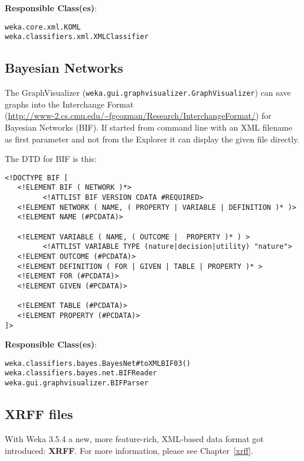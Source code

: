 \noindent \textbf{Responsible Class(es)}:

\begin{verbatim}
weka.core.xml.KOML
weka.classifiers.xml.XMLClassifier
\end{verbatim}

\subsection{Bayesian Networks}
The GraphVisualizer (\verb=weka.gui.graphvisualizer.GraphVisualizer=) can
save graphs into the Interchange Format\\
(\url{http://www-2.cs.cmu.edu/~fgcozman/Research/InterchangeFormat/}{}) for
Bayesian Networks (BIF). If started from command line with an XML
filename as first parameter and not from the Explorer it can display
the given file directly.

The DTD for BIF is this:

\begin{verbatim}
<!DOCTYPE BIF [
   <!ELEMENT BIF ( NETWORK )*>
         <!ATTLIST BIF VERSION CDATA #REQUIRED>
   <!ELEMENT NETWORK ( NAME, ( PROPERTY | VARIABLE | DEFINITION )* )>
   <!ELEMENT NAME (#PCDATA)>

   <!ELEMENT VARIABLE ( NAME, ( OUTCOME |  PROPERTY )* ) >
         <!ATTLIST VARIABLE TYPE (nature|decision|utility) "nature">
   <!ELEMENT OUTCOME (#PCDATA)>
   <!ELEMENT DEFINITION ( FOR | GIVEN | TABLE | PROPERTY )* >
   <!ELEMENT FOR (#PCDATA)>
   <!ELEMENT GIVEN (#PCDATA)>

   <!ELEMENT TABLE (#PCDATA)>
   <!ELEMENT PROPERTY (#PCDATA)>
]>
\end{verbatim}

\noindent \textbf{Responsible Class(es)}:

\begin{verbatim}
weka.classifiers.bayes.BayesNet#toXMLBIF03()
weka.classifiers.bayes.net.BIFReader
weka.gui.graphvisualizer.BIFParser
\end{verbatim}

\subsection{XRFF files}
With Weka 3.5.4 a new, more feature-rich, XML-based data format got
introduced: \textbf{XRFF}. For more information, please see
Chapter~\ref{xrff}.


